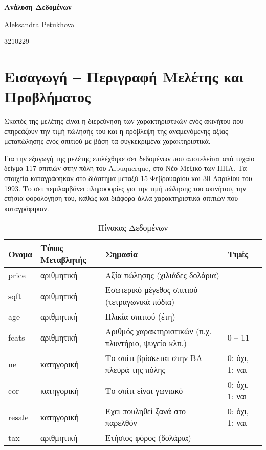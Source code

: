 \documentclass[
  10pt,
]{article}
\author{}
\date{\vspace{-2.5em}}
\begin{document}
\begin{titlepage}
  \centering
  \vspace*{2cm}
  
  {\Huge\bfseries Ανάλυση Δεδομένων\par}
  \vspace{1.5cm}
  

  {\Large Aleksandra Petukhova\par}
  \vspace{1cm}
 
  {\Large 3210229\par}
  \vspace{0.5cm}

  \vfill
\end{titlepage}

\section*{Εισαγωγή – Περιγραφή Μελέτης και Προβλήματος}

Σκοπός της μελέτης είναι η διερεύνηση των χαρακτηριστικών ενός ακινήτου
που επηρεάζουν την τιμή πώλησής του και η πρόβλεψη της αναμενόμενης
αξίας μεταπώλησης ενός σπιτιού με βάση τα συγκεκριμένα χαρακτηριστικά.

Για την εξαγωγή της μελέτης επιλέχθηκε σετ δεδομένων που αποτελείται από
τυχαίο δείγμα 117 σπιτιών στην πόλη του Albuquerque, στο Νέο Μεξικό των
ΗΠΑ. Τα στοιχεία καταγράφηκαν στο διάστημα μεταξύ 15 Φεβρουαρίου και 30
Απριλίου του 1993. Το σετ περιλαμβάνει πληροφορίες για την τιμή πώλησης
του ακινήτου, την ετήσια φορολόγηση του, καθώς και διάφορα άλλα
χαρακτηριστικά σπιτιών που καταγράφηκαν.

\begin{longtable}[t]{llll}
\caption{\label{tab:unnamed-chunk-1}Πίνακας Δεδομένων}\\
\toprule
\textbf{Όνομα} & \textbf{Τύπος Μεταβλητής} & \textbf{Σημασία} & \textbf{Τιμές}\\
\midrule
price & αριθμητική & Αξία πώλησης (χιλιάδες δολάρια) & \\
sqft & αριθμητική & Εσωτερικό μέγεθος σπιτιού (τετραγωνικά πόδια) & \\
age & αριθμητική & Ηλικία σπιτιού (έτη) & \\
feats & αριθμητική & Αριθμός χαρακτηριστικών (π.χ. πλυντήριο, ψυγείο κλπ.) & 0 – 11\\
ne & κατηγορική & Το σπίτι βρίσκεται στην ΒΑ πλευρά της πόλης & 0: όχι, 1: ναι\\
\addlinespace
cor & κατηγορική & Το σπίτι είναι γωνιακό & 0: όχι, 1: ναι\\
resale & κατηγορική & Έχει πουληθεί ξανά στο παρελθόν & 0: όχι, 1: ναι\\
tax & αριθμητική & Ετήσιος φόρος (δολάρια) & \\
\bottomrule
\end{longtable}
\end{document}
